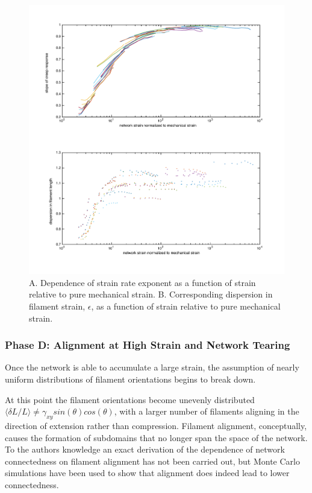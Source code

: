 \documentclass[pre,preprint]{revtex4-1}
\begin{document}
\begin{figure}[h!]
\centering
\includegraphics[width=\hsize]{strain_collapse}
\caption{\label{fig:strain_coll} A. Dependence of strain rate exponent as a function of strain relative to pure mechanical strain.  B.  Corresponding dispersion in filament strain, $\epsilon$, as a function of strain relative to pure mechanical strain. }
\end{figure}

\subsubsection{Phase D: Alignment at High Strain and Network Tearing}

Once the network is able to accumulate a large strain, the assumption of nearly uniform distributions of filament orientations begins to break down.

At this point the filament orientations become unevenly distributed $\langle \delta L / L \rangle \neq \gamma_{xy}sin(\theta)cos(\theta)$, with a larger number of filaments aligning in the direction of extension rather than compression.  Filament alignment, conceptually, causes the formation of subdomains that no longer span the space of the network. To the authors knowledge an exact derivation of the dependence of network connectedness on filament alignment has not been carried out, but Monte Carlo simulations have been used to show that alignment does indeed lead to lower connectedness\cite{model_percolationanisotropy}.
\end{document}
